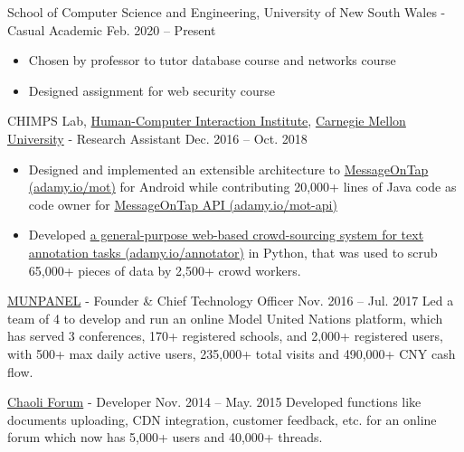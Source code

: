\documentclass[hidelinks__VERSION__]{adamyi-cv}
\begin{document}
\begin{entrylist}


\entry
{School of Computer Science and Engineering, University of New South Wales - Casual Academic}
{Feb. 2020 -- Present}
{
\begin{minipage}[t]{1\linewidth}
\begin{itemize}[leftmargin=*,align=left,noitemsep]
\item Chosen by professor to tutor database course and networks course
\item Designed assignment for web security course
\end{itemize}
\end{minipage}
}


\entry
{CHIMPS Lab, \href{https://www.hcii.cmu.edu/}{Human-Computer Interaction Institute}, \href{https://www.cmu.edu/}{Carnegie Mellon University} - Research Assistant}
{Dec. 2016 -- Oct. 2018}
{
\begin{minipage}[t]{1\linewidth}
\begin{itemize}[leftmargin=*,align=left,noitemsep]
\item Designed and implemented an extensible architecture to \href{https://adamy.io/mot}{MessageOnTap (adamy.io/mot)} for Android while contributing 20,000+ lines of Java code as code owner for \href{https://adamy.io/mot-api}{MessageOnTap API (adamy.io/mot-api)}
\item Developed \href{https://adamy.io/annotator}{a general-purpose web-based crowd-sourcing system for text annotation tasks (adamy.io/annotator)} in Python, that was used to scrub 65,000+ pieces of data by 2,500+ crowd workers.
\end{itemize}
\end{minipage}
}


\entry
{\href{https://www.munpanel.com}{MUNPANEL} - Founder \& Chief Technology Officer}
{Nov. 2016 -- Jul. 2017}
{Led a team of 4 to develop and run an online Model United Nations platform, which has served 3 conferences, 170+ registered schools, and 2,000+ registered users, with 500+ max daily active users, 235,000+ total visits and 490,000+ CNY cash flow.}


\entry
{\href{https://chaoli.club}{Chaoli Forum} - Developer}
{Nov. 2014 -- May. 2015}
{Developed functions like documents uploading, CDN integration, customer feedback, etc. for an online forum which now has 5,000+ users and 40,000+ threads.}

\end{entrylist}
\end{document}
